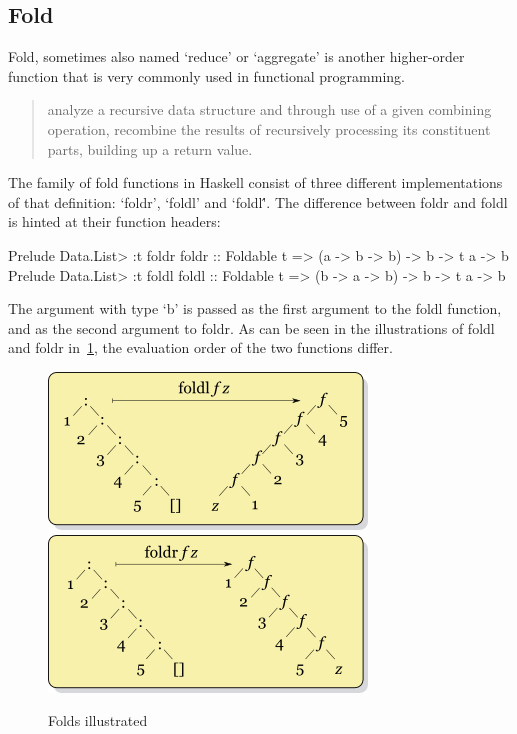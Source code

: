 \subsection{Fold}\label{sec:fold}

Fold, sometimes also named `reduce' or `aggregate' is another higher-order function
that is very commonly used in functional programming.

\begin{quote}
    analyze a recursive data structure and through use of a given
    combining operation, recombine the results of recursively processing its
    constituent parts, building up a return value.\autocite{fold-wiki}
\end{quote}

The family of fold functions in Haskell consist of three different implementations of
that definition: `foldr', `foldl' and `foldl\''.
The difference between foldr and foldl is hinted at their function headers:
\begin{code}
    \begin{haskellcode}
Prelude Data.List> :t foldr
foldr :: Foldable t => (a -> b -> b) -> b -> t a -> b
Prelude Data.List> :t foldl
foldl :: Foldable t => (b -> a -> b) -> b -> t a -> b
    \end{haskellcode}
\end{code}

The argument with type `b' is passed as the first argument to the foldl
function, and as the second argument to foldr. As can be seen in the illustrations
of foldl and foldr in~\ref{fig:fold}, the evaluation order of the two functions
differ.

\begin{figure}[h!]
    \centering
    \includegraphics[scale=0.5]{../img/foldl.png}
    \includegraphics[scale=0.5]{../img/foldr.png}
    \caption{Folds illustrated\autocite{fold-wiki}}
    \label{fig:fold}
\end{figure}

